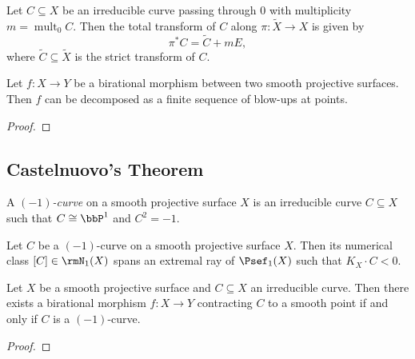     \begin{proposition}\label{prop:pull_back_of_curves_pass_through_center_along_blow_up}
        Let \(C \subseteq X\) be an irreducible curve passing through \(0\) with multiplicity \(m = \operatorname{mult}_0 C\).
        Then the total transform of \(C\) along \(\pi:\tilde{X} \to X\) is given by
        \[ \pi^* C = \tilde{C} + m E, \]
        where \(\tilde{C}\subseteq \tilde{X}\) is the strict transform of \(C\).
    \end{proposition}

    \begin{theorem}\label{thm:birational_map_decomposition_on_surfaces}
        Let \(f:X \to Y\) be a birational morphism between two smooth projective surfaces.
        Then \(f\) can be decomposed as a finite sequence of blow-ups at points.
    \end{theorem}
    \begin{proof}
    \end{proof}

\subsection{Castelnuovo's Theorem}

    \begin{definition}\label{def:-1-curve}
        A \emph{\((-1)\)-curve} on a smooth projective surface \(X\) is an irreducible curve \(C\subseteq X\) such that \(C\cong \bbP^1\) and \(C^2=-1\).
    \end{definition}

    \begin{remark}\label{rmk:-1-curve_and_extremal_ray_of_Psef_1}
        Let \(C\) be a \((-1)\)-curve on a smooth projective surface \(X\).
        Then its numerical class \([C]\in \rmN_1(X)\) spans an extremal ray of \(\Psef_1(X)\) such that \(K_X\cdot C < 0\).
    \end{remark}

    \begin{theorem}\label{thm:castelnuovo_contractibility_criterion}
        Let \(X\) be a smooth projective surface and \(C\subseteq X\) an irreducible curve.
        Then there exists a birational morphism \(f:X\to Y\) contracting \(C\) to a smooth point if and only if \(C\) is a \((-1)\)-curve.
    \end{theorem}
    \begin{proof}
    \end{proof}

